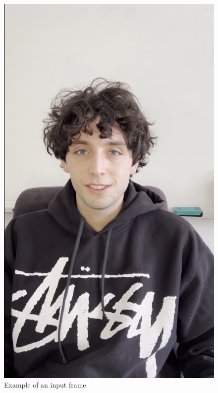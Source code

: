 \documentclass[preprint]{elsarticle}
\begin{document}
\begin{figure}[t]
	\centering
	\includegraphics[scale=0.18, keepaspectratio]{img/project_img/init.png}
	\caption{Example of an input frame.}\label{fig:init-frame}
\end{figure}
\end{document}

